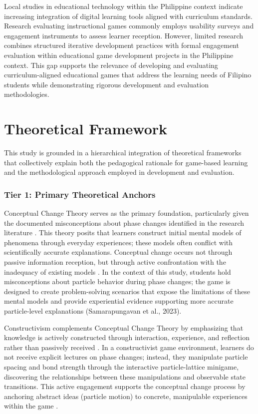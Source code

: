 Local studies in educational technology within the Philippine context indicate increasing integration of digital learning tools aligned with curriculum standards. Research evaluating instructional games commonly employs usability surveys and engagement instruments to assess learner reception. However, limited research combines structured iterative development practices with formal engagement evaluation within educational game development projects in the Philippine context. This gap supports the relevance of developing and evaluating curriculum-aligned educational games that address the learning needs of Filipino students while demonstrating rigorous development and evaluation methodologies.

\section{Theoretical Framework}

This study is grounded in a hierarchical integration of theoretical frameworks that collectively explain both the pedagogical rationale for game-based learning and the methodological approach employed in development and evaluation.

\subsubsection{Tier 1: Primary Theoretical Anchors}

Conceptual Change Theory serves as the primary foundation, particularly given the documented misconceptions about phase changes identified in the research literature \cite{Posner1982}. This theory posits that learners construct initial mental models of phenomena through everyday experiences; these models often conflict with scientifically accurate explanations. Conceptual change occurs not through passive information reception, but through active confrontation with the inadequacy of existing models \cite{Posner1982}. In the context of this study, students hold misconceptions about particle behavior during phase changes; the game is designed to create problem-solving scenarios that expose the limitations of these mental models and provide experiential evidence supporting more accurate particle-level explanations (Samarapungavan et al., 2023).

Constructivism complements Conceptual Change Theory by emphasizing that knowledge is actively constructed through interaction, experience, and reflection rather than passively received \cite{Bruner1966, Kolb1984}. In a constructivist game environment, learners do not receive explicit lectures on phase changes; instead, they manipulate particle spacing and bond strength through the interactive particle-lattice minigame, discovering the relationships between these manipulations and observable state transitions. This active engagement supports the conceptual change process by anchoring abstract ideas (particle motion) to concrete, manipulable experiences within the game \cite{Kolb1984}.

